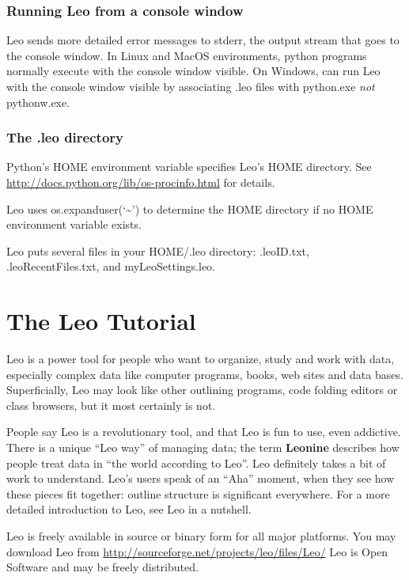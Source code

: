 \documentclass[a4paper,10pt,english]{sphinxmanual}
\begin{document}
\subsection{Running Leo from a console window}
\label{installing:running-leo-from-a-console-window}
Leo sends more detailed error messages to stderr,
the output stream that goes to the console window. In Linux and MacOS
environments, python programs normally execute with the console window visible.
On Windows, can run Leo with the console window visible by associating .leo
files with python.exe \emph{not} pythonw.exe.


\subsection{The .leo directory}
\label{installing:the-leo-directory}
Python's HOME environment variable specifies Leo's HOME directory.
See \href{http://docs.python.org/lib/os-procinfo.html}{http://docs.python.org/lib/os-procinfo.html} for details.

Leo uses os.expanduser(`\textasciitilde{}') to determine the HOME directory if no HOME environment variable exists.

Leo puts several files in your HOME/.leo directory:
.leoID.txt, .leoRecentFiles.txt, and myLeoSettings.leo.


\chapter{The Leo Tutorial}
\label{intro::doc}\label{intro:the-leo-tutorial}
Leo is a power tool for people who want to organize, study and work with data,
especially complex data like computer programs, books, web sites and data bases.
Superficially, Leo may look like other outlining programs, code folding editors
or class browsers, but it most certainly is not.

People say Leo is a revolutionary tool, and that Leo is fun to use, even
addictive. There is a unique ``Leo way'' of managing data; the term \textbf{Leonine}
describes how people treat data in ``the world according to Leo''. Leo definitely
takes a bit of work to understand. Leo's users speak of an ``Aha'' moment, when
they see how these pieces fit together: outline structure is significant
everywhere.  For a more detailed introduction to Leo, see Leo in a nutshell.

Leo is freely available in source or binary form for all major platforms. You
may download Leo from \href{http://sourceforge.net/projects/leo/files/Leo/}{http://sourceforge.net/projects/leo/files/Leo/} Leo is Open
Software and may be freely distributed.
\end{document}
